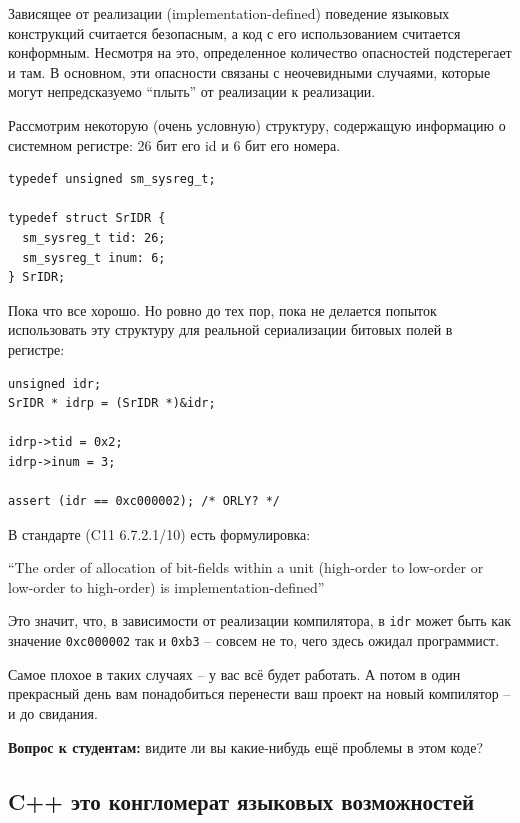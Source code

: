 \documentclass[a4paper,12pt,oneside]{article}
\newif\ifanswers
\begin{document}
Зависящее от реализации (implementation-defined) поведение языковых конструкций считается безопасным, а код с его использованием считается конформным. Несмотря на это, определенное количество опасностей подстерегает и там. В основном, эти опасности связаны с неочевидными случаями, которые могут непредсказуемо ``плыть'' от реализации к реализации.

Рассмотрим некоторую (очень условную) структуру, содержащую информацию о системном регистре: 26 бит его id и 6 бит его номера.

\begin{lstlisting}
typedef unsigned sm_sysreg_t;

typedef struct SrIDR {
  sm_sysreg_t tid: 26;
  sm_sysreg_t inum: 6;
} SrIDR;
\end{lstlisting}

Пока что все хорошо. Но ровно до тех пор, пока не делается попыток использовать эту структуру для реальной сериализации битовых полей в регистре:

\begin{lstlisting}
unsigned idr;
SrIDR * idrp = (SrIDR *)&idr;

idrp->tid = 0x2;
idrp->inum = 3;

assert (idr == 0xc000002); /* ORLY? */
\end{lstlisting}

В стандарте (C11 6.7.2.1/10) есть формулировка: 

``The order of allocation of bit-fields within a unit (high-order to low-order or low-order to high-order) is implementation-defined''

Это значит, что, в зависимости от реализации компилятора, в \lstinline!idr! может быть как значение \lstinline!0xc000002! так и \lstinline!0xb3! -- совсем не то, чего здесь ожидал программист.

Самое плохое в таких случаях -- у вас всё будет работать. А потом в один прекрасный день вам понадобиться перенести ваш проект на новый компилятор -- и до свидания.

\textbf{Вопрос к студентам:} видите ли вы какие-нибудь ещё проблемы в этом коде?

\ifanswers
Правильный ответ: разумеется тип \lstinline!unsigned! не обязан занимать ровно 32 бита. Это также implementation-defined будет ли он таким. Для верности в таких случаях лучше использовать \lstinline!uint32_t!.
\fi

\subsection{C++ это конгломерат языковых возможностей}\label{CppNature}
\end{document}
